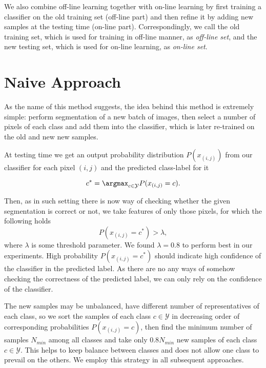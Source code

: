 We also combine off-line learning together with on-line learning by first training a classifier on the old training set (off-line part) and then refine it
by adding new samples at the testing time (on-line part). Correspondingly, we call the old training set, which is used for training in off-line manner,
as \emph{off-line set}, and the new testing set, which is used for on-line learning, as \emph{on-line set}.

\section{Naive Approach}
\label{sec:naive_theory}

As the name of this method suggests, the idea behind this method is extremely simple: perform segmentation of a new batch of images, then select a 
number of pixels of each class and add them into the classifier, which is later re-trained on the old and new new samples. 

At testing time we get an output probability distribution $P(x_{(i, j)})$ from our classifier for each pixel $(i, j)$ and
the predicted class-label for it

\begin{equation}
 c^* = \argmax_{c \in \mathcal{Y}} P(x_{(i, j)} = c).
\end{equation}

Then, as in such setting there is now way of checking whether the given 
segmentation is correct or not, we take features of only those pixels, for which the following holds
\begin{equation}
 P(x_{(i, j)} = c^*) > \lambda,
\end{equation}
where $\lambda$ is some threshold parameter. We found $\lambda = 0.8$ to perform best in our experiments.
High probability $P(x_{(i, j)} = c^*)$ should indicate high confidence of the classifier in the predicted label.
As there are no any ways of somehow checking the correctness of the predicted label, we can only rely on the confidence of the classifier.

The new samples may be unbalanced, \ie have different number of representatives of each class, so we sort the samples of each class $c \in \mathcal{Y}$
in decreasing order of corresponding probabilities $P(x_{(i, j)} = c)$, then find the minimum number of samples $N_{min}$ among all classes and take
only $0.8 N_{min}$ new samples of each class $c \in \mathcal{Y}$. This helps to keep balance between classes and does not allow one class to prevail on
the others. We employ this strategy in all subsequent approaches.

